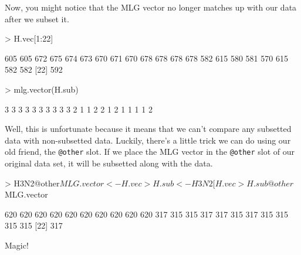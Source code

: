 \documentclass[letterpaper]{article}
\begin{document}
Now, you might notice that the MLG vector no longer matches up with our data after we subset it.
\begin{Schunk}
\begin{Sinput}
> H.vec[1:22]
\end{Sinput}
\begin{Soutput}
 [1] 605 605 672 675 674 673 670 671 670 678 678 678 678 582 615 580 581 570 615 582 582
[22] 592
\end{Soutput}
\begin{Sinput}
> mlg.vector(H.sub)
\end{Sinput}
\begin{Soutput}
 [1] 3 3 3 3 3 3 3 3 3 3 2 1 1 2 2 1 2 1 1 1 1 2
\end{Soutput}
\end{Schunk}
Well, this is unfortunate because it means that we can't compare any subsetted data with non-subsetted data. Luckily, there's a little trick we can do using our old friend, the \texttt{@other} slot.
If we place the MLG vector in the \texttt{@other} slot of our original data set, it will be subsetted along with the data.
\begin{Schunk}
\begin{Sinput}
> H3N2@other$MLG.vector <- H.vec
> H.sub <- H3N2[H.vec %
> H.sub@other$MLG.vector
\end{Sinput}
\begin{Soutput}
 [1] 620 620 620 620 620 620 620 620 620 620 317 315 315 317 317 315 317 315 315 315 315
[22] 317
\end{Soutput}
\end{Schunk}
Magic!\\
\end{document}

